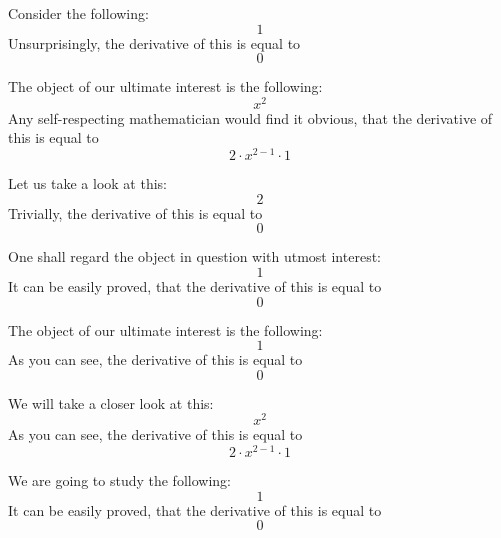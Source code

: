 \documentclass{article}
\begin{document}
Consider the following:
\begin{equation}
1 
\end{equation}
Unsurprisingly, the derivative of this is equal to
\begin{equation}
0 
\end{equation}

The object of our ultimate interest is the following:
\begin{equation}
x ^{2 } 
\end{equation}
Any self-respecting mathematician would find it obvious, that the derivative of this is equal to
\begin{equation}
2 \cdot x ^{2 - 1 } \cdot 1 
\end{equation}

Let us take a look at this:
\begin{equation}
2 
\end{equation}
Trivially, the derivative of this is equal to
\begin{equation}
0 
\end{equation}

One shall regard the object in question with utmost interest:
\begin{equation}
1 
\end{equation}
It can be easily proved, that the derivative of this is equal to
\begin{equation}
0 
\end{equation}

The object of our ultimate interest is the following:
\begin{equation}
1 
\end{equation}
As you can see, the derivative of this is equal to
\begin{equation}
0 
\end{equation}

We will take a closer look at this:
\begin{equation}
x ^{2 } 
\end{equation}
As you can see, the derivative of this is equal to
\begin{equation}
2 \cdot x ^{2 - 1 } \cdot 1 
\end{equation}

We are going to study the following:
\begin{equation}
1 
\end{equation}
It can be easily proved, that the derivative of this is equal to
\begin{equation}
0 
\end{equation}
\end{document}
